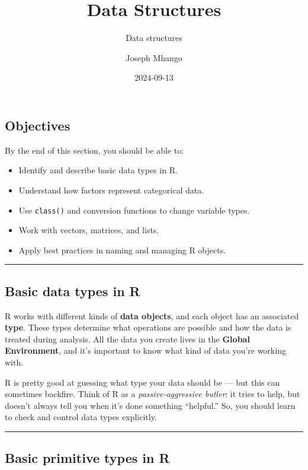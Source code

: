 \documentclass[
  letterpaper,
  DIV=11,
  numbers=noendperiod]{scrartcl}
\title{Data Structures}
\subtitle{Data structures}
\author{Joseph Mhango}
\date{2024-09-13}
\providecommand{\tightlist}{%
  \setlength{\itemsep}{0pt}\setlength{\parskip}{0pt}}\usepackage{longtable,booktabs,array}
\begin{document}
\maketitle


\subsection{Objectives}\label{objectives}

By the end of this section, you should be able to:

\begin{itemize}
\tightlist
\item
  Identify and describe basic data types in R.
\item
  Understand how factors represent categorical data.
\item
  Use \texttt{class()} and conversion functions to change variable
  types.
\item
  Work with vectors, matrices, and lists.
\item
  Apply best practices in naming and managing R objects.
\end{itemize}

\begin{center}\rule{0.5\linewidth}{0.5pt}\end{center}

\subsection{Basic data types in R}\label{basic-data-types-in-r}

R works with different kinds of \textbf{data objects}, and each object
has an associated \textbf{type}. These types determine what operations
are possible and how the data is treated during analysis. All the data
you create lives in the \textbf{Global Environment}, and it's important
to know what kind of data you're working with.

R is pretty good at guessing what type your data should be --- but this
can sometimes backfire. Think of R as a \emph{passive-aggressive
butler}: it tries to help, but doesn't always tell you when it's done
something ``helpful.'' So, you should learn to check and control data
types explicitly.

\begin{center}\rule{0.5\linewidth}{0.5pt}\end{center}

\subsection{Basic primitive types in
R}\label{basic-primitive-types-in-r}
\end{document}
